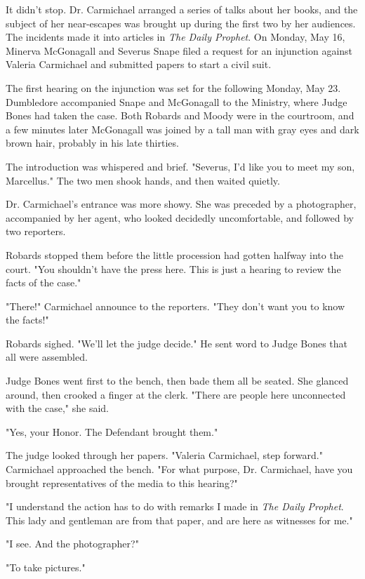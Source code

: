 It didn't stop. Dr. Carmichael arranged a series of talks about her books, and the subject of her near-escapes was brought up during the first two by her audiences. The incidents made it into articles in \emph{The Daily Prophet}. On Monday, May 16, Minerva McGonagall and Severus Snape filed a request for an injunction against Valeria Carmichael and submitted papers to start a civil suit.

The first hearing on the injunction was set for the following Monday, May 23. Dumbledore accompanied Snape and McGonagall to the Ministry, where Judge Bones had taken the case. Both Robards and Moody were in the courtroom, and a few minutes later McGonagall was joined by a tall man with gray eyes and dark brown hair, probably in his late thirties.

The introduction was whispered and brief. "Severus, I'd like you to meet my son, Marcellus." The two men shook hands, and then waited quietly.

Dr. Carmichael's entrance was more showy. She was preceded by a photographer, accompanied by her agent, who looked decidedly uncomfortable, and followed by two reporters.

Robards stopped them before the little procession had gotten halfway into the court. "You shouldn't have the press here. This is just a hearing to review the facts of the case."

"There!" Carmichael announce to the reporters. "They don't want you to know the facts!"

Robards sighed. "We'll let the judge decide." He sent word to Judge Bones that all were assembled.

Judge Bones went first to the bench, then bade them all be seated. She glanced around, then crooked a finger at the clerk. "There are people here unconnected with the case," she said.

"Yes, your Honor. The Defendant brought them."

The judge looked through her papers. "Valeria Carmichael, step forward." Carmichael approached the bench. "For what purpose, Dr. Carmichael, have you brought representatives of the media to this hearing?"

"I understand the action has to do with remarks I made in \emph{The Daily Prophet}. This lady and gentleman are from that paper, and are here as witnesses for me."

"I see. And the photographer?"

"To take pictures."


